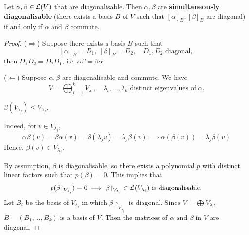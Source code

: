 \documentclass[a4paper]{article}
\begin{document}
\begin{theorem}
	Let $ \alpha, \beta \in {\mathcal{L}}(V)$ that are diagonalisable.
	Then $ \alpha, \beta $ are \textbf{simultaneously diagonalisable} (there exists a basis $ B $ of $ V $ such that $ [\alpha]_B, [\beta]_B $ are diagonal) if and only if $ \alpha $ and $ \beta $ commute.
\end{theorem}
\begin{proof}
	($ \Rightarrow $)
	Suppose there exists a basis $B$ such that 
	\[
		[\alpha]_{B} = D_1,\ [\beta]_B = D_2,\quad D_1,D_2 \text{ diagonal}, 
	\]
	then $ D_1D_2 = D_2D_1 $, i.e. $ \alpha \beta = \beta \alpha $. 

	($ \Leftarrow $)
	Suppose $\alpha,\beta$ are diagonalisable and commute. We have
	\[
		V = \bigoplus_{i=1}^k V_{\lambda_i},\quad \lambda_i, \dots, \lambda_k \text{ distinct eigenvalues of } \alpha. 
	\]
	\begin{claim}
		$ \beta(V_{\lambda_j}) \le V_{\lambda_j} $. 
	\end{claim}
	Indeed, for $ v \in V_{\lambda_j} $,
	\[
		\alpha \beta(v) = \beta \alpha(v) = \beta(\lambda_j v) = \lambda_j \beta(v) \implies \alpha(\beta(v)) = \lambda_j \beta(v)
	\]
	Hence, $ \beta(v) \in V_{\lambda_j} $. 

	By assumption, $ \beta $ is diagonalisable, so there exists a polynomial $ p $ with distinct linear factors such that $ p(\beta) = 0 $. This implies that
	\[
		p(\beta \mathord{\upharpoonright}_{V_{\lambda_i}}) = 0 \implies \beta \mathord{\upharpoonright}_{V_{\lambda_i}}\in {\mathcal{L}}(V_{\lambda_i}) \text{ is diagonalisable.}
	\]
	Let $ B_i $ be the basis of $ V_{\lambda_i} $ in which $ \beta\restriction_{V_{\lambda_j}} $ is diagonal.
	Since $ V = \bigoplus V_{\lambda_i} $, $ B = (B_1, \dots, B_k) $ is a basis of $ V $.
	Then the matrices of $ \alpha $ and $ \beta $ in $ V $ are diagonal.
\end{proof}
\end{document}

